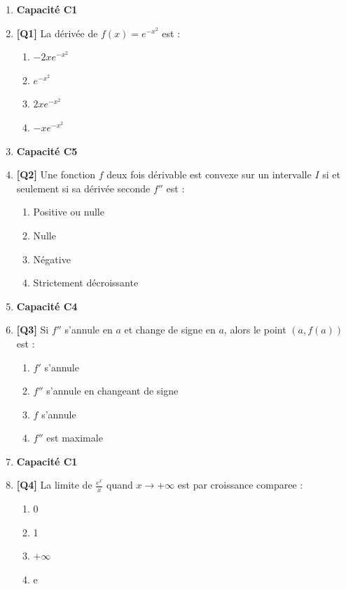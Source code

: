 \begin{enumerate}

\item[] \textbf{Capacité C1}

\item \textbf{[Q1]} La dérivée de $f(x) = e^{-x^2}$ est :
  \begin{enumerate}[label=\Alph*.]
    \item $-2x e^{-x^2}$
    \item $e^{-x^2}$
    \item $2x e^{-x^2}$
    \item $-x e^{-x^2}$
  \end{enumerate}

\item[] \textbf{Capacité C5}

\item \textbf{[Q2]} Une fonction $f$ deux fois dérivable est convexe sur un intervalle $I$ si et seulement si sa dérivée seconde $f''$ est :
  \begin{enumerate}[label=\Alph*.]
    \item Positive ou nulle
    \item Nulle
    \item Négative
    \item Strictement décroissante
  \end{enumerate}

\item[] \textbf{Capacité C4}

\item \textbf{[Q3]} Si $f''$ s'annule en $a$ et change de signe en $a$, alors le point $(a,f(a))$ est :
  \begin{enumerate}[label=\Alph*.]
    \item $f'$ s'annule
    \item $f''$ s'annule en changeant de signe
    \item $f$ s'annule
    \item $f''$ est maximale
  \end{enumerate}

\item[] \textbf{Capacité C1}

\item \textbf{[Q4]} La limite de $\frac{e^x}{x}$ quand $x \to +\infty$ est par croissance comparee :
  \begin{enumerate}[label=\Alph*.]
    \item 0
    \item 1
    \item $+\infty$
    \item e
  \end{enumerate}


\end{enumerate}
